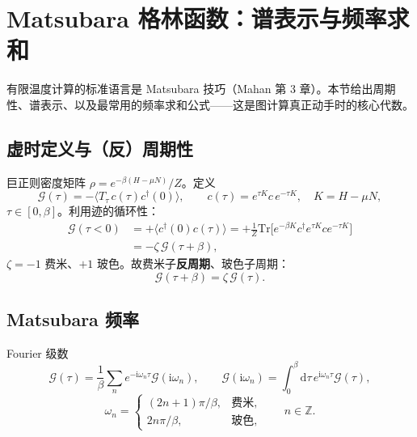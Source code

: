 \section{Matsubara 格林函数：谱表示与频率求和}

有限温度计算的标准语言是 Matsubara 技巧（Mahan 第 3 章）。本节给出周期性、谱表示、以及最常用的频率求和公式——这是图计算真正动手时的核心代数。

\subsection{虚时定义与（反）周期性}

巨正则密度矩阵 $\rho=e^{-\beta(H-\mu N)}/Z$。定义
\begin{equation}
  \mathcal{G}(\tau)
  =-\bigl\langle T_\tau\,c(\tau)c^\dagger(0)\bigr\rangle,
  \qquad
  c(\tau)=e^{\tau K}c\,e^{-\tau K},
  \quad K=H-\mu N,
\end{equation}
$\tau\in[0,\beta]$。利用迹的循环性：
\begin{equation}
\begin{aligned}
  \mathcal{G}(\tau<0)
  &=+\bigl\langle c^\dagger(0)c(\tau)\bigr\rangle
  =+\frac{1}{Z}\mathrm{Tr}\bigl[e^{-\beta K}c^\dagger e^{\tau K}c e^{-\tau K}\bigr]\\
  &=-\zeta\,\mathcal{G}(\tau+\beta),
\end{aligned}
\end{equation}
$\zeta=-1$ 费米、$+1$ 玻色。故费米子\textbf{反周期}、玻色子周期：
\begin{equation}
  \mathcal{G}(\tau+\beta)=\zeta\,\mathcal{G}(\tau).
\label{eq:Gperiod}
\end{equation}

\subsection{Matsubara 频率}

Fourier 级数
\begin{equation}
  \mathcal{G}(\tau)
  =\frac{1}{\beta}\sum_n
  e^{-\mathrm{i}\omega_n\tau}\mathcal{G}(\mathrm{i}\omega_n),
  \qquad
  \mathcal{G}(\mathrm{i}\omega_n)
  =\int_0^\beta\mathrm{d}\tau\,
  e^{\mathrm{i}\omega_n\tau}\mathcal{G}(\tau),
\end{equation}
\begin{equation}
  \omega_n
  =
  \begin{cases}
    (2n+1)\pi/\beta, & \text{费米},\\
    2n\pi/\beta, & \text{玻色},
  \end{cases}
  \qquad n\in\mathbb{Z}.
\end{equation}

